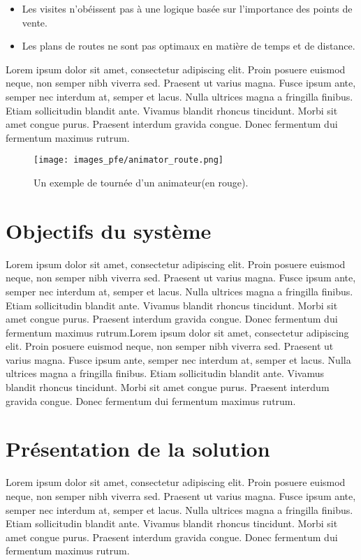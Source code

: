 \begin{itemize}
    \item Les visites n'obéissent pas à une logique basée sur l'importance des points de vente.
    \item Les plans de routes ne sont pas optimaux en matière de temps et de distance.
\end{itemize}

\medskip

Lorem ipsum dolor sit amet, consectetur adipiscing elit. Proin posuere euismod neque, non semper nibh viverra sed. Praesent ut varius magna. Fusce ipsum ante, semper nec interdum at, semper et lacus. Nulla ultrices magna a fringilla finibus. Etiam sollicitudin blandit ante. Vivamus blandit rhoncus tincidunt. Morbi sit amet congue purus. Praesent interdum gravida congue. Donec fermentum dui fermentum maximus rutrum.

\begin{figure}[hbt!]
  \centering
  \texttt{[image: images\_pfe/animator\_route.png]}
  \caption{Un exemple de tournée d'un animateur(en rouge).}
  \label{fig:tournee-animateur-example}
\end{figure}
\FloatBarrier

\section{Objectifs du système}
Lorem ipsum dolor sit amet, consectetur adipiscing elit. Proin posuere euismod neque, non semper nibh viverra sed. Praesent ut varius magna. Fusce ipsum ante, semper nec interdum at, semper et lacus. Nulla ultrices magna a fringilla finibus. Etiam sollicitudin blandit ante. Vivamus blandit rhoncus tincidunt. Morbi sit amet congue purus. Praesent interdum gravida congue. Donec fermentum dui fermentum maximus rutrum.Lorem ipsum dolor sit amet, consectetur adipiscing elit. Proin posuere euismod neque, non semper nibh viverra sed. Praesent ut varius magna. Fusce ipsum ante, semper nec interdum at, semper et lacus. Nulla ultrices magna a fringilla finibus. Etiam sollicitudin blandit ante. Vivamus blandit rhoncus tincidunt. Morbi sit amet congue purus. Praesent interdum gravida congue. Donec fermentum dui fermentum maximus rutrum.


\section{Présentation de la solution}
Lorem ipsum dolor sit amet, consectetur adipiscing elit. Proin posuere euismod neque, non semper nibh viverra sed. Praesent ut varius magna. Fusce ipsum ante, semper nec interdum at, semper et lacus. Nulla ultrices magna a fringilla finibus. Etiam sollicitudin blandit ante. Vivamus blandit rhoncus tincidunt. Morbi sit amet congue purus. Praesent interdum gravida congue. Donec fermentum dui fermentum maximus rutrum.

